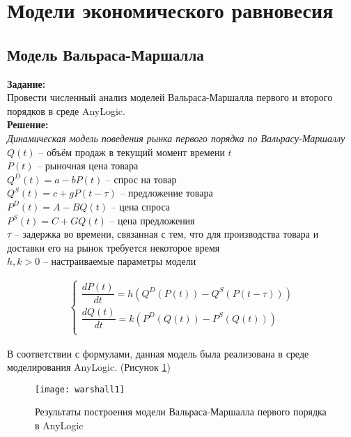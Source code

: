 \section*{Модели экономического равновесия}
\subsection*{Модель Вальраса-Маршалла}

\textbf{Задание:}\\
Провести численный анализ моделей Вальраса-Маршалла первого и второго порядков в среде AnyLogic.\\

\textbf{Решение:}\\
\textit{Динамическая модель поведения рынка первого порядка по Вальрасу-Маршаллу}\\

$Q(t)$ -- объём продаж в текущий момент времени $t$\\
$P(t)$ -- рыночная цена товара\\
$Q^D(t) = a - b P(t)$ -- спрос на товар\\
$Q^S(t) = c + g P(t - \tau)$ -- предложение товара\\
$P^D(t) = A - BQ(t)$ -- цена спроса\\
$P^S(t) = C + GQ(t)$ -- цена предложения\\
$\tau$ -- задержка во времени, связанная с тем, что для производства товара и доставки его на рынок требуется некоторое время\\
$h, k > 0$ -- настраиваемые параметры модели

\begin{align*}
	\begin{cases}
		\dfrac{dP(t)}{dt} = h \left( Q^D(P(t)) - Q^S(P(t - \tau)) \right)\\[10pt]
		\dfrac{dQ(t)}{dt} = k \left( P^D(Q(t)) - P^S(Q(t)) \right)\\
	\end{cases}
\end{align*}

В соответствии с формулами, данная модель была реализована в среде моделирования AnyLogic. (Рисунок \ref{fig:warshall1})
\begin{figure}[h]
	\centering \texttt{[image: warshall1]}
	\caption{Результаты построения модели Вальраса-Маршалла первого порядка в AnyLogic}
	\label{fig:warshall1}
\end{figure}

